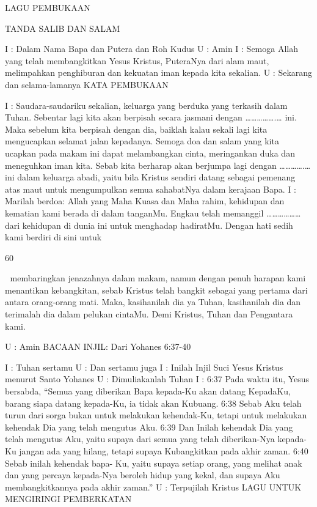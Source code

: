 LAGU PEMBUKAAN 

TANDA SALIB DAN SALAM 

I : Dalam Nama Bapa dan Putera dan Roh Kudus 
U : Amin 
I : Semoga Allah yang telah membangkitkan Yesus Kristus, 
PuteraNya dari alam maut, melimpahkan penghiburan dan kekuatan 
iman kepada kita sekalian. 
U : Sekarang dan selama-lamanya 
KATA PEMBUKAAN 

I : Saudara-saudariku sekalian, keluarga yang berduka yang terkasih 
dalam Tuhan. Sebentar lagi kita akan berpisah secara jasmani dengan 
…………….… ini. Maka sebelum kita berpisah dengan dia, baiklah 
kalau sekali lagi kita mengucapkan selamat jalan kepadanya. Semoga 
doa dan salam yang kita ucapkan pada makam ini dapat 
melambangkan cinta, meringankan duka dan meneguhkan iman kita. 
Sebab kita berharap akan berjumpa lagi dengan ………….… ini 
dalam keluarga abadi, yaitu bila Kristus sendiri datang sebagai 
pemenang atas maut untuk mengumpulkan semua sahabatNya dalam 
kerajaan Bapa. 
I : Marilah berdoa: 
Allah yang Maha Kuasa dan Maha rahim, kehidupan dan kematian 
kami berada di dalam tanganMu. Engkau telah memanggil 
……………… dari kehidupan di dunia ini untuk menghadap 
hadiratMu. Dengan hati sedih kami berdiri di sini untuk 

60 



membaringkan jenazahnya dalam makam, namun dengan penuh 
harapan kami menantikan kebangkitan, sebab Kristus telah bangkit 
sebagai yang pertama dari antara orang-orang mati. Maka, 
kasihanilah dia ya Tuhan, kasihanilah dia dan terimalah dia dalam 
pelukan cintaMu. Demi Kristus, Tuhan dan Pengantara kami. 

U : Amin 
BACAAN INJIL: Dari Yohanes 6:37-40 

I : Tuhan sertamu 
U : Dan sertamu juga 
I : Inilah Injil Suci Yesus Kristus menurut Santo Yohanes 
U : Dimuliakanlah Tuhan 
I : 6:37 Pada waktu itu, Yesus bersabda, “Semua yang diberikan 
Bapa kepada-Ku akan datang KepadaKu, barang siapa datang 
kepada-Ku, ia tidak akan Kubuang. 6:38 Sebab Aku telah turun dari 
sorga bukan untuk melakukan kehendak-Ku, tetapi untuk melakukan 
kehendak Dia yang telah mengutus Aku. 6:39 Dan Inilah kehendak 
Dia yang telah mengutus Aku, yaitu supaya dari semua yang telah 
diberikan-Nya kepada-Ku jangan ada yang hilang, tetapi supaya 
Kubangkitkan pada akhir zaman. 6:40 Sebab inilah kehendak bapa-
Ku, yaitu supaya setiap orang, yang melihat anak dan yang percaya 
kepada-Nya beroleh hidup yang kekal, dan supaya Aku 
membangkitkannya pada akhir zaman.” 
U : Terpujilah Kristus 
LAGU UNTUK MENGIRINGI PEMBERKATAN 

